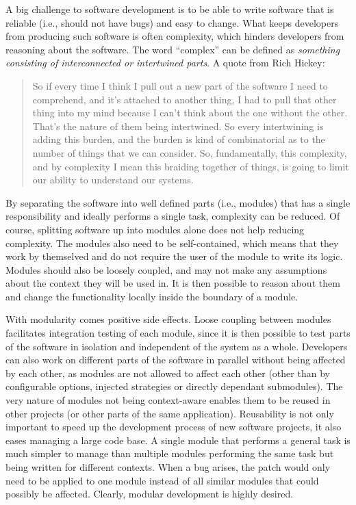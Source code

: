 \documentclass[a4paper,11pt]{kth-mag}
\begin{document}
        A big challenge to software development is to be able to write software that is reliable (i.e., should not have bugs) and easy to change.
        What keeps developers from producing such software is often complexity, which hinders developers from reasoning about the software.
        The word ``complex'' can be defined as \emph{something consisting of interconnected or intertwined parts}.
        A quote from Rich Hickey:
        \begin{quote}
          So if every time I think I pull out a new part of the software I need to comprehend, and it's attached to another thing, I had to pull that other thing into my mind because I can't think about the one without the other.
          That's the nature of them being intertwined. So every intertwining is adding this burden, and the burden is kind of combinatorial as to the number of things that we can consider.
          So, fundamentally, this complexity, and by complexity I mean this braiding together of things, is going to limit our ability to understand our systems.
        \end{quote}
        By separating the software into well defined parts (i.e., modules) that has a single responsibility and ideally performs a single task, complexity can be reduced.
        Of course, splitting software up into modules alone does not help reducing complexity.
        The modules also need to be self-contained, which means that they work by themselved and do not require the user of the module to write its logic.
        Modules should also be loosely coupled, and may not make any assumptions about the context they will be used in.
        It is then possible to reason about them and change the functionality locally inside the boundary of a module.
        
        With modularity comes positive side effects.
        Loose coupling between modules facilitates integration testing of each module, since it is then possible to test parts of the software in isolation and independent of the system as a whole.
        Developers can also work on different parts of the software in parallel without being affected by each other, as modules are not allowed to affect each other (other than by configurable options, injected strategies or directly dependant submodules).
        The very nature of modules not being context-aware enables them to be reused in other projects (or other parts of the same application).
        Reusability is not only important to speed up the development process of new software projects, it also eases managing a large code base.
        A single module that performs a general task is much simpler to manage than multiple modules performing the same task but being written for different contexts.
        When a bug arises, the patch would only need to be applied to one module instead of all similar modules that could possibly be affected.
        Clearly, modular development is highly desired.
\end{document}
